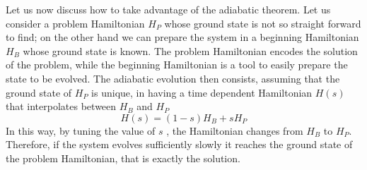 \noindent
Let us now discuss how to take advantage of the adiabatic theorem. Let us consider a problem Hamiltonian $H_P$ whose ground state is not so straight forward to find; on the other hand we can prepare the system in a beginning Hamiltonian $H_B$ whose ground state is known. The problem Hamiltonian encodes the solution of the problem, while the beginning Hamiltonian is a tool to easily prepare the state to be evolved. The adiabatic evolution then consists, assuming that the ground state of $H_P$ is unique, in having a time dependent Hamiltonian $H(s)$ that interpolates between $H_B$ and $H_P$
    \begin{equation}
        H(s) = (1-s)H_B + s H_P
    \end{equation}
    In this way, by tuning the value of $s$ , the Hamiltonian changes from $H_B$ to $H_P$. Therefore, if the system evolves sufficiently slowly it reaches the ground state of the problem Hamiltonian, that is exactly the solution.

